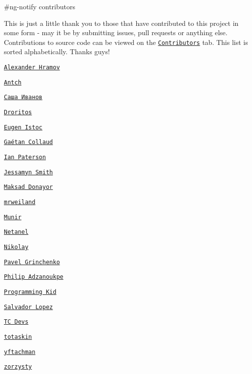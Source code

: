 \#ng-\/notify contributors

This is just a little thank you to those that have contributed to this project in some form -\/ may it be by submitting issues, pull requests or anything else. Contributions to source code can be viewed on the \href{https://github.com/matowens/ng-notify/graphs/contributors}{\tt Contributors} tab. This list is sorted alphabetically. Thanks guys!


\begin{DoxyItemize}
\item \href{https://github.com/fduch2k}{\tt Alexander Hramov}
\item \href{https://github.com/antch}{\tt Antch}
\item \href{https://github.com/solo12zw74}{\tt Саша Иванов}
\item \href{https://github.com/Droritos}{\tt Droritos}
\item \href{https://github.com/genu}{\tt Eugen Istoc}
\item \href{https://github.com/gaetancollaud}{\tt Gaétan Collaud}
\item \href{https://github.com/idpaterson}{\tt Ian Paterson}
\item \href{https://github.com/jessamynsmith}{\tt Jessamyn Smith}
\item \href{https://github.com/maksad}{\tt Maksad Donayor}
\item \href{https://github.com/mrweiland}{\tt mrweiland}
\item \href{https://github.com/mgoku}{\tt Munir}
\item \href{https://github.com/NetanelBasal}{\tt Netanel}
\item \href{https://github.com/nzamosenchuk}{\tt Nikolay}
\item \href{https://github.com/PSDCoder}{\tt Pavel Grinchenko}
\item \href{https://github.com/epigos}{\tt Philip Adzanoukpe}
\item \href{https://github.com/programming-kid}{\tt Programming Kid}
\item \href{https://github.com/simiographics}{\tt Salvador Lopez}
\item \href{https://github.com/tcdevs}{\tt TC Devs}
\item \href{https://github.com/totaskin}{\tt totaskin}
\item \href{https://github.com/yftachman}{\tt yftachman}
\item \href{https://github.com/zorzysty}{\tt zorzysty} 
\end{DoxyItemize}